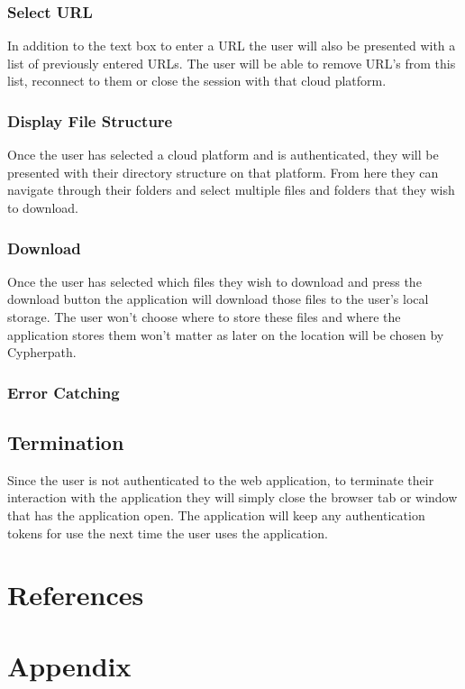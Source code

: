 \documentclass{article}
\begin{document}
            \subsubsection{Select URL}
            In addition to the text box to enter a URL the user will also be presented with a list of previously entered URLs. The user will be able to remove URL's from this list, reconnect to them
            or close the session with that cloud platform.

            \subsubsection{Display File Structure}
            Once the user has selected a cloud platform and is authenticated, they will be presented with their directory structure on that platform. From here they can navigate through their folders and
            select multiple files and folders that they wish to download.

            \subsubsection{Download}
            Once the user has selected which files they wish to download and press the download button the application will download those files to the user's local storage. The user won't choose where to store these
            files and where the application stores them won't matter as later on the location will be chosen by Cypherpath.

            \subsubsection{Error Catching}

        \subsection{Termination}
        Since the user is not authenticated to the web application, to terminate their interaction with the application they will simply close the browser tab or window that has the
        application open. The application will keep any authentication tokens for use the next time the user uses the application.


    \section*{References}

    \appendix
    \section{Appendix}
\end{document}
